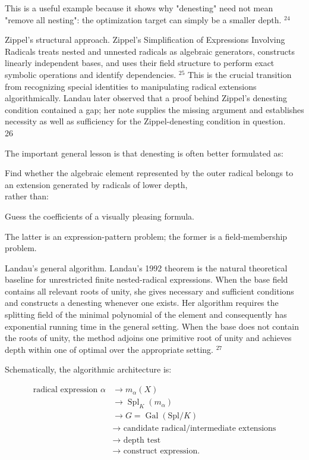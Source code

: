 \documentclass[10pt]{article}
\begin{document}
This is a useful example because it shows why "denesting" need not mean "remove all nesting": the optimization target can simply be a smaller depth. ${ }^{24}$

Zippel's structural approach. Zippel's Simplification of Expressions Involving Radicals treats nested and unnested radicals as algebraic generators, constructs linearly independent bases, and uses their field structure to perform exact symbolic operations and identify dependencies. ${ }^{25}$ This is the crucial transition from recognizing special identities to manipulating radical extensions algorithmically. Landau later observed that a proof behind Zippel's denesting condition contained a gap; her note supplies the missing argument and establishes necessity as well as sufficiency for the Zippel-denesting condition in question.\\
26

The important general lesson is that denesting is often better formulated as:

Find whether the algebraic element represented by the outer radical belongs to an extension generated by radicals of lower depth,\\
rather than:

Guess the coefficients of a visually pleasing formula.

The latter is an expression-pattern problem; the former is a field-membership problem.

Landau's general algorithm. Landau's 1992 theorem is the natural theoretical baseline for unrestricted finite nested-radical expressions. When the base field contains all relevant roots of unity, she gives necessary and sufficient conditions and constructs a denesting whenever one exists. Her algorithm requires the splitting field of the minimal polynomial of the element and consequently has exponential running time in the general setting. When the base does not contain the roots of unity, the method adjoins one primitive root of unity and achieves depth within one of optimal over the appropriate setting. ${ }^{27}$

Schematically, the algorithmic architecture is:

$$
\begin{aligned}
\text { radical expression } \alpha & \rightarrow m_{\alpha}(X) \\
& \rightarrow \operatorname{Spl}_{K}\left(m_{\alpha}\right) \\
& \rightarrow G=\operatorname{Gal}(\mathrm{Spl} / K) \\
& \rightarrow \text { candidate radical/intermediate extensions } \\
& \rightarrow \text { depth test } \\
& \rightarrow \text { construct expression. }
\end{aligned}
$$
\end{document}
